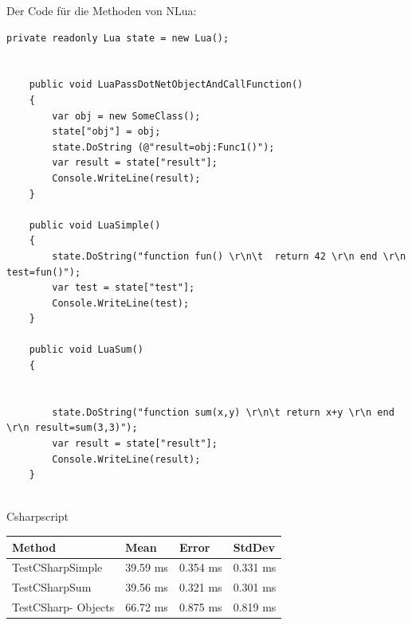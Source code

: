 \newpage
 Der Code für die Methoden von NLua:
\begin{lstlisting}[language={[Sharp]C}, caption=NluaTestMethods, label=lst:imp:nluam]
    private readonly Lua state = new Lua();

    
    public void LuaPassDotNetObjectAndCallFunction()
    {
        var obj = new SomeClass();
        state["obj"] = obj;
        state.DoString (@"result=obj:Func1()");
        var result = state["result"];
        Console.WriteLine(result);
    }

    public void LuaSimple()
    {
        state.DoString("function fun() \r\n\t  return 42 \r\n end \r\n test=fun()");
        var test = state["test"];
        Console.WriteLine(test);
    }

    public void LuaSum()
    {


        state.DoString("function sum(x,y) \r\n\t return x+y \r\n end \r\n result=sum(3,3)");
        var result = state["result"];
        Console.WriteLine(result);
    }
    
\end{lstlisting}

\newpage
Csharpscript
        \begin{table}[H]
            \begin{tabular}{|p{3.5cm}|p{3cm}|p{3cm}|p{3cm}|}
            \hline
                Method & Mean & Error & StdDev \\ \hline
                TestCSharpSimple & 39.59 ms & 0.354 ms & 0.331 ms \\ \hline
                TestCSharpSum & 39.56 ms & 0.321 ms & 0.301 ms \\ \hline
                TestCSharp-
                Objects & 66.72 ms & 0.875 ms & 0.819 ms \\ \hline
            \end{tabular}
        \end{table}

